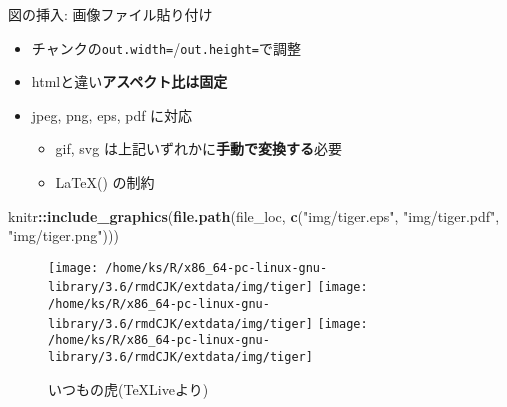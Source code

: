 \documentclass[
  12pt,
  ignorenonframetext,
]{beamer}
\newenvironment{Shaded}{\begin{snugshade}}{\end{snugshade}}
\newcommand{\KeywordTok}[1]{\textcolor[rgb]{0.13,0.29,0.53}{\textbf{#1}}}
\newcommand{\NormalTok}[1]{#1}
\newcommand{\OperatorTok}[1]{\textcolor[rgb]{0.81,0.36,0.00}{\textbf{#1}}}
\newcommand{\StringTok}[1]{\textcolor[rgb]{0.31,0.60,0.02}{#1}}
\providecommand{\tightlist}{%
  \setlength{\itemsep}{0pt}\setlength{\parskip}{0pt}}
\begin{document}
\begin{frame}[fragile]{図の挿入: 画像ファイル貼り付け}
\protect\hypertarget{ux56f3ux306eux633fux5165-ux753bux50cfux30d5ux30a1ux30a4ux30ebux8cbcux308aux4ed8ux3051}{}

\begin{itemize}
\tightlist
\item
  チャンクの\texttt{out.width=}/\texttt{out.height=}で調整
\item
  htmlと違い\textbf{アスペクト比は固定}
\item
  jpeg, png, eps, pdf に対応

  \begin{itemize}
  \tightlist
  \item
    gif, svg は上記いずれかに\textbf{手動で変換する}必要
  \item
    \LaTeX (\XeLaTeX) の制約
  \end{itemize}
\end{itemize}

\begin{Shaded}
\begin{Highlighting}[]
\NormalTok{knitr}\OperatorTok{::}\KeywordTok{include_graphics}\NormalTok{(}\KeywordTok{file.path}\NormalTok{(file_loc, }\KeywordTok{c}\NormalTok{(}\StringTok{"img/tiger.eps"}\NormalTok{, }\StringTok{"img/tiger.pdf"}\NormalTok{, }\StringTok{"img/tiger.png"}\NormalTok{)))}
\end{Highlighting}
\end{Shaded}

\begin{figure}

{\centering \texttt{[image: /home/ks/R/x86\_64-pc-linux-gnu-library/3.6/rmdCJK/extdata/img/tiger]} \texttt{[image: /home/ks/R/x86\_64-pc-linux-gnu-library/3.6/rmdCJK/extdata/img/tiger]} \texttt{[image: /home/ks/R/x86\_64-pc-linux-gnu-library/3.6/rmdCJK/extdata/img/tiger]} 

}

\caption{いつもの虎(TeXLiveより)}\label{fig:unnamed-chunk-1}
\end{figure}

\end{frame}
\end{document}

